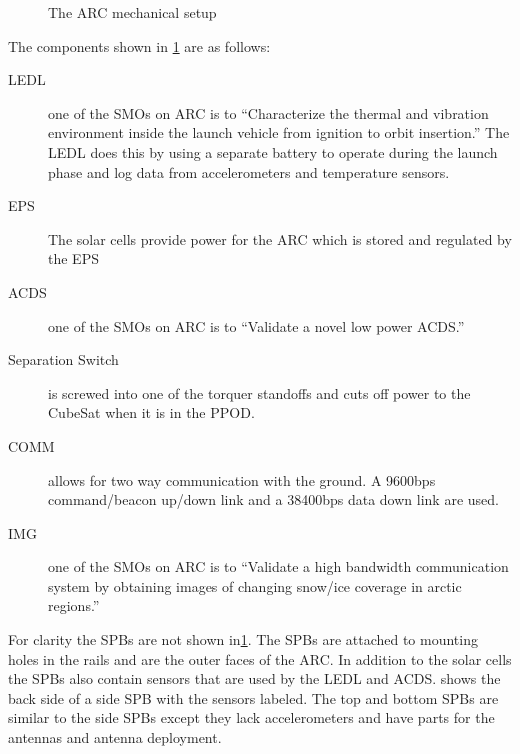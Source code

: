 \begin{figure}[!ht]
    \caption{The \acs{ARC} mechanical setup}
    \label{fig:arcMech}
\end{figure}

The components shown in \cref{fig:arcMech} are as follows:

\begin{description}
    \item[\acs{LEDL}] one of the \acp{SMO} on \ac{ARC} is to ``Characterize the thermal and vibration environment inside the launch vehicle from ignition to orbit insertion.''\cite{ARCweb} The \ac{LEDL} does this by using a separate battery to operate during the launch phase and log data from accelerometers and temperature sensors.
    \item[\acs{EPS}] The solar cells provide power for the \ac{ARC} which is stored and regulated by the \ac{EPS}
    \item[\acs{ACDS}] one of the \acp{SMO} on \ac{ARC} is to ``Validate a novel low power \acf{ACDS}.'' \cite{ARCweb}
    \item[Separation Switch] is screwed into one of the torquer standoffs and cuts off power to the CubeSat when it is in the \ac{PPOD}.
    \item[\acs{COMM}] allows for two way communication with the ground. A 9600bps command/beacon up/down link and a 38400bps data down link are used.
    \item[\acs{IMG}] one of the \acp{SMO} on \ac{ARC} is to ``Validate a high bandwidth communication system by obtaining images of changing snow/ice coverage in arctic regions.''\cite{ARCweb}
\end{description}

For clarity the \acp{SPB} are not shown in\cref{fig:arcMech}. The \acp{SPB} are attached to mounting holes in the rails and are the outer faces of the \ac{ARC}. In addition to the solar cells the \acp{SPB} also contain sensors that are used by the \ac{LEDL} and \ac{ACDS}.  shows the back side of a side \ac{SPB} with the sensors labeled. The top and bottom \acp{SPB} are similar to the side \acp{SPB} except they lack accelerometers and have parts for the antennas and antenna deployment.

